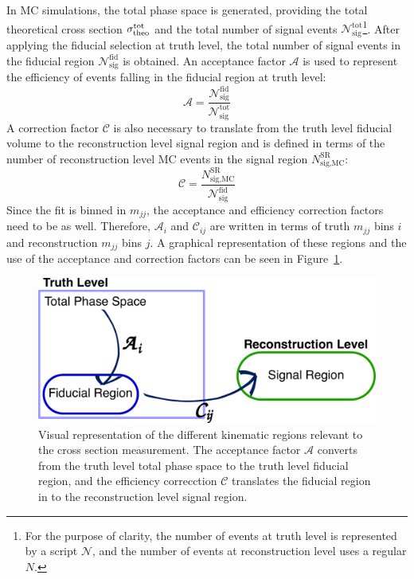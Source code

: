 In MC simulations, the total phase space is generated, providing the total theoretical cross section $\sigma_{\textrm{theo}}^{\textrm{tot}}$
and the total number of signal events $\mathcal{N}_{\textrm{sig}}^{\textrm{tot}}$\footnote{For the purpose of clarity, the number of events at truth level is represented by a script $\mathcal{N}$, and the number of events at reconstruction level uses a regular $N$.}.
After applying the fiducial selection at truth level, the total number of signal events in the fiducial region $\mathcal{N}_{\textrm{sig}}^{\textrm{fid}}$ is obtained.
An acceptance factor $\mathcal{A}$ is used to represent the efficiency of events falling in the fiducial region at truth level:
\begin{equation}
  \mathcal{A} = \frac{\mathcal{N}_{\textrm{sig}}^{\textrm{fid}}}{\mathcal{N}_{\textrm{sig}}^{\textrm{tot}}}
  \label{eq:ssww13tev_xsec_acceptance}
\end{equation}
A correction factor $\mathcal{C}$ is also necessary to translate from the truth level fiducial volume to the reconstruction level signal region and is defined in terms of the number of reconstruction level MC events in the signal region $N_{\textrm{sig,MC}}^{\textrm{SR}}$:
\begin{equation}
  \mathcal{C} = \frac{N_{\textrm{sig,MC}}^{\textrm{SR}}}{\mathcal{N}_{\textrm{sig}}^{\textrm{fid}}}
  \label{eq:ssww13tev_xsec_efficiency}
\end{equation}
Since the fit is binned in $m_{jj}$, the acceptance and efficiency correction factors need to be as well.
Therefore, $\mathcal{A}_i$ and $\mathcal{C}_{ij}$ are written in terms of truth $m_{jj}$ bins $i$ and reconstruction $m_{jj}$ bins $j$.
A graphical representation of these regions and the use of the acceptance and correction factors can be seen in Figure~\ref{fig:ssww13tev_xsec_fiducial_graphic}.

\begin{figure}[htbp]
  \centering
  \includegraphics[width=.8\textwidth]{figs/ssww_13tev/xsec/fiducial}
  \caption{Visual representation of the different kinematic regions relevant to the cross section measurement.  The acceptance factor $\mathcal{A}$ converts from the truth level total phase space to the truth level fiducial region, and the efficiency correcction $\mathcal{C}$ translates the fiducial region in to the reconstruction level signal region.}
  \label{fig:ssww13tev_xsec_fiducial_graphic}
\end{figure}

